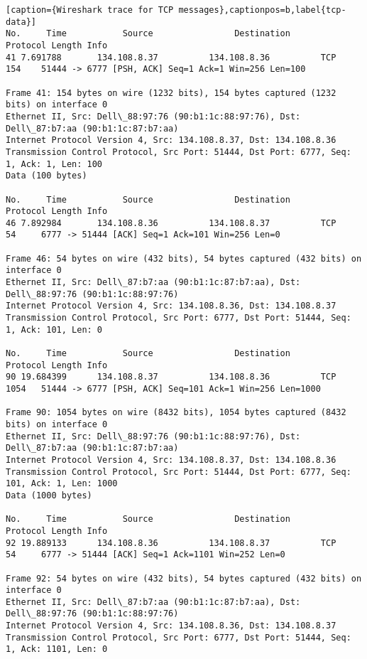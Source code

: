 \begin{lstlisting}[caption={Wireshark trace for TCP messages},captionpos=b,label{tcp-data}]
No.     Time           Source                Destination           Protocol Length Info
41 7.691788       134.108.8.37          134.108.8.36          TCP      154    51444 -> 6777 [PSH, ACK] Seq=1 Ack=1 Win=256 Len=100

Frame 41: 154 bytes on wire (1232 bits), 154 bytes captured (1232 bits) on interface 0
Ethernet II, Src: Dell\_88:97:76 (90:b1:1c:88:97:76), Dst: Dell\_87:b7:aa (90:b1:1c:87:b7:aa)
Internet Protocol Version 4, Src: 134.108.8.37, Dst: 134.108.8.36
Transmission Control Protocol, Src Port: 51444, Dst Port: 6777, Seq: 1, Ack: 1, Len: 100
Data (100 bytes)

No.     Time           Source                Destination           Protocol Length Info
46 7.892984       134.108.8.36          134.108.8.37          TCP      54     6777 -> 51444 [ACK] Seq=1 Ack=101 Win=256 Len=0

Frame 46: 54 bytes on wire (432 bits), 54 bytes captured (432 bits) on interface 0
Ethernet II, Src: Dell\_87:b7:aa (90:b1:1c:87:b7:aa), Dst: Dell\_88:97:76 (90:b1:1c:88:97:76)
Internet Protocol Version 4, Src: 134.108.8.36, Dst: 134.108.8.37
Transmission Control Protocol, Src Port: 6777, Dst Port: 51444, Seq: 1, Ack: 101, Len: 0

No.     Time           Source                Destination           Protocol Length Info
90 19.684399      134.108.8.37          134.108.8.36          TCP      1054   51444 -> 6777 [PSH, ACK] Seq=101 Ack=1 Win=256 Len=1000

Frame 90: 1054 bytes on wire (8432 bits), 1054 bytes captured (8432 bits) on interface 0
Ethernet II, Src: Dell\_88:97:76 (90:b1:1c:88:97:76), Dst: Dell\_87:b7:aa (90:b1:1c:87:b7:aa)
Internet Protocol Version 4, Src: 134.108.8.37, Dst: 134.108.8.36
Transmission Control Protocol, Src Port: 51444, Dst Port: 6777, Seq: 101, Ack: 1, Len: 1000
Data (1000 bytes)

No.     Time           Source                Destination           Protocol Length Info
92 19.889133      134.108.8.36          134.108.8.37          TCP      54     6777 -> 51444 [ACK] Seq=1 Ack=1101 Win=252 Len=0

Frame 92: 54 bytes on wire (432 bits), 54 bytes captured (432 bits) on interface 0
Ethernet II, Src: Dell\_87:b7:aa (90:b1:1c:87:b7:aa), Dst: Dell\_88:97:76 (90:b1:1c:88:97:76)
Internet Protocol Version 4, Src: 134.108.8.36, Dst: 134.108.8.37
Transmission Control Protocol, Src Port: 6777, Dst Port: 51444, Seq: 1, Ack: 1101, Len: 0


\end{lstlisting}
